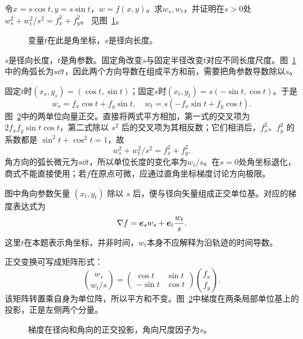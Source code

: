 \begin{exercise}[转动坐标中的链式法则]\label{ex:c3-h2}
令$x=s\cos t,y=s\sin t$，$w=f(x,y)$。求$w_s,w_t$，并证明在$s>0$处$w_s^2+w_t^2/s^2=f_x^2+f_y^2$。 见图~\ref{fig:c3-h2-q}。
\end{exercise}

\begin{figure}[H]\centering
{}
\caption{变量$t$在此是角坐标，$s$是径向长度。}\label{fig:c3-h2-q}
\end{figure}
\begin{solution}
$s$是径向长度，$t$是角参数。固定角改变$s$与固定半径改变$t$对应不同长度尺度。图~\ref{fig:c3-h2-q}中的角弧长为$s\dd t$，因此两个方向导数在组成平方和前，需要把角参数导数除以$s$。


固定$t$时$(x_s,y_s)=(\cos t,\sin t)$；固定$s$时$(x_t,y_t)=s(-\sin t,\cos t)$。于是
\[w_s=f_x\cos t+f_y\sin t,\quad
w_t=s(-f_x\sin t+f_y\cos t).
\]
图~\ref{fig:c3-h2-s}中的两单位向量正交。直接将两式平方相加，第一式的交叉项为 $2f_xf_y\sin t\cos t$，第二式除以 $s^2$ 后的交叉项为其相反数；它们相消后，$f_x^2$、$f_y^2$ 的系数都是 $\sin^2t+\cos^2t=1$，故
\[\boxed{w_s^2+w_t^2/s^2=f_x^2+f_y^2}.\]
角方向的弧长微元为$s\dd t$，所以单位长度的变化率为$w_t/s$。在$s=0$处角坐标退化，商式不能直接使用；若$f$在原点可微，应通过直角坐标梯度讨论方向极限。


图中角向参数矢量 $(x_t,y_t)$ 除以 $s$ 后，便与径向矢量组成正交单位基。对应的梯度表达式为
\[\nabla f=\bm{e}_s w_s+\bm{e}_t\frac{w_t}{s}.\]
这里$t$在本题表示角坐标，并非时间，$w_t$本身不应解释为沿轨迹的时间导数。

正交变换可写成矩阵形式：
\[\binom{w_s}{w_t/s}=
\begin{pmatrix}\cos t&\sin t\\-\sin t&\cos t\end{pmatrix}
\binom{f_x}{f_y}.\]
该矩阵转置乘自身为单位阵，所以平方和不变。图~\ref{fig:c3-h2-s}中梯度在两条局部单位基上的投影，正是左侧两个分量。


\begin{figure}[H]\centering
{}
\caption{梯度在径向和角向的正交投影，角向尺度因子为$s$。}\label{fig:c3-h2-s}
\end{figure}
\end{solution}

